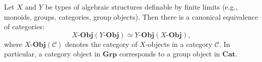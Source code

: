 Let $X$ and $Y$ be types of algebraic structures definable by finite limits (e.g., monoids, groups, categories, group objects). Then there is a canonical equivalence of categories:
$$
X\text{-}\mathbf{Obj}(Y\text{-}\mathbf{Obj}) \simeq Y\text{-}\mathbf{Obj}(X\text{-}\mathbf{Obj}),
$$
where $X\text{-}\mathbf{Obj}(\mathcal{C})$ denotes the category of $X$-objects in a category $\mathcal{C}$. In particular, a category object in $\mathbf{Grp}$ corresponds to a group object in $\mathbf{Cat}$.
